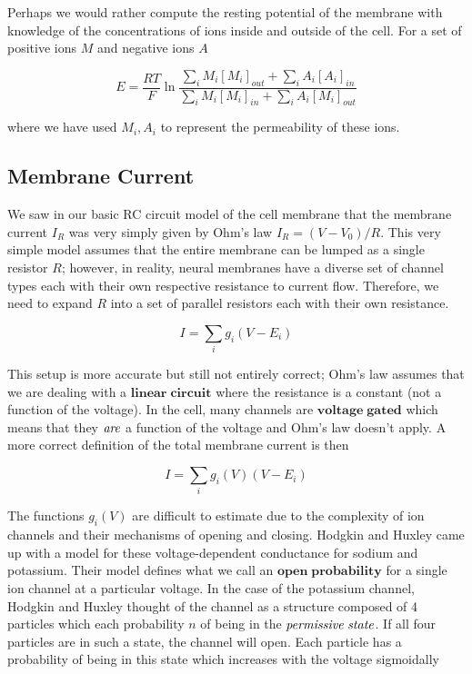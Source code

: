 \documentclass[a4paper,11pt]{book}
\begin{document}
Perhaps we would rather compute the resting potential of the membrane with knowledge of the concentrations of ions inside and outside of the cell. For a set of positive ions $M$ and negative ions $A$

\begin{equation*}
E = \frac{RT}{F}\ln \frac{\sum_{i} M_{i}[M_{i}]_{out} + \sum_{i} A_{i}[A_{i}]_{in}}{\sum_{i} M_{i}[M_{i}]_{in} +\sum_{i} A_{i}[M_{i}]_{out}}
\end{equation*}

where we have used $M_{i}, A_{i}$ to represent the permeability of these ions.

\subsection{Membrane Current}

We saw in our basic RC circuit model of the cell membrane that the membrane current $I_{R}$ was very simply given by Ohm's law $I_{R} = (V-V_{0})/R$. This very simple model assumes that the entire membrane can be lumped as a single resistor $R$; however, in reality, neural membranes have a diverse set of channel types each with their own respective resistance to current flow. Therefore, we need to expand $R$ into a set of parallel resistors each with their own resistance.

\begin{equation*}
I = \sum_{i} g_{i}(V-E_{i})
\end{equation*}

This setup is more accurate but still not entirely correct; Ohm's law assumes that we are dealing with a $\mathbf{linear \; circuit}$ where the resistance is a constant (not a function of the voltage). In the cell, many channels are $\mathbf{voltage \; gated}$ which means that they $\it{are}$ a function of the voltage and Ohm's law doesn't apply. A more correct definition of the total membrane current is then

\begin{equation}
I = \sum_{i} g_{i}(V)(V-E_{i})
\end{equation}

The functions $g_{i}(V)$ are difficult to estimate due to the complexity of ion channels and their mechanisms of opening and closing. Hodgkin and Huxley came up with a model for these voltage-dependent conductance for sodium and potassium. Their model defines what we call an $\mathbf{open \; probability}$ for a single ion channel at a particular voltage. In the case of the potassium channel, Hodgkin and Huxley thought of the channel as a structure composed of 4 particles which each probability $n$ of being in the $\it{permissive\; state}$. If all four particles are in such a state, the channel will open. Each particle has a probability of being in this state which increases with the voltage sigmoidally
\end{document}
